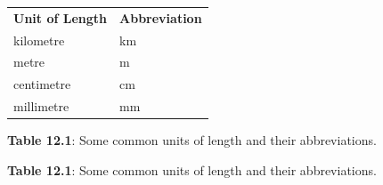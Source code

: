           \begin{table}
        \begin{center}
      \label{m39370*uid8}
    \noindent
      \tablelasttail{}
      \begin{xtabular}[t]{|l|l|}\hline
                \textbf{Unit of Length}
               &
                \textbf{Abbreviation}
     \tabularnewline{}
        kilometre &
        km%
     \tabularnewline{}
        metre &
        m%
     \tabularnewline{}
        centimetre &
        cm%
     \tabularnewline{}
        millimetre &
        mm%
     \tabularnewline{}
    \end{xtabular}
      \end{center}
    \begin{center}{\small\bfseries Table 12.1}: Some common units of length and their abbreviations.\end{center}
    \begin{caption}{\small\bfseries Table 12.1}: Some common units of length and their abbreviations.\end{caption}
\end{table}
    \par
    \label{m39370*cid4}
